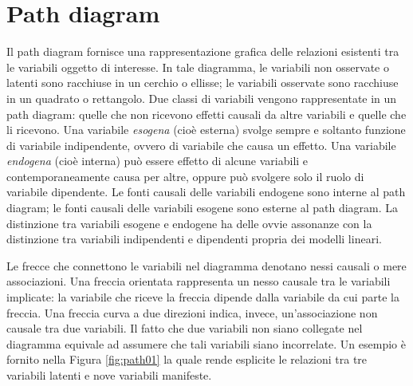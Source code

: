 \documentclass[
  11pt,
]{krantz}
\theoremstyle{definition}
\theoremstyle{definition}
\theoremstyle{definition}
\theoremstyle{definition}
\theoremstyle{remark}
\begin{document}
\hypertarget{path-diagram}{%
\section{Path diagram}\label{path-diagram}}

Il path diagram fornisce una rappresentazione grafica delle relazioni esistenti tra le variabili oggetto di interesse. In tale diagramma, le variabili non osservate o latenti sono racchiuse in un cerchio o ellisse; le variabili osservate sono racchiuse in un quadrato o rettangolo. Due classi di variabili vengono rappresentate in un path diagram: quelle che non ricevono effetti causali da altre variabili e quelle che li ricevono. Una variabile \emph{esogena} (cioè esterna) svolge sempre e soltanto funzione di variabile indipendente, ovvero di variabile che causa un effetto. Una variabile \emph{endogena} (cioè interna) può essere effetto di alcune variabili e contemporaneamente causa per altre, oppure può svolgere solo il ruolo di variabile dipendente. Le fonti causali delle variabili endogene sono interne al path diagram; le fonti causali delle variabili esogene sono esterne al path diagram. La distinzione tra variabili esogene e endogene ha delle ovvie assonanze con la distinzione tra variabili indipendenti e dipendenti propria dei modelli lineari.

Le frecce che connettono le variabili nel diagramma denotano nessi causali o mere associazioni. Una freccia orientata rappresenta un nesso causale tra le variabili implicate: la variabile che riceve la freccia dipende dalla variabile da cui parte la freccia. Una freccia curva a due direzioni indica, invece, un'associazione non causale tra due variabili. Il fatto che due variabili non siano collegate nel diagramma equivale ad assumere che tali variabili siano incorrelate. Un esempio è fornito nella Figura \ref{fig:path01} la quale rende esplicite le relazioni tra tre variabili latenti e nove variabili manifeste.
\end{document}
